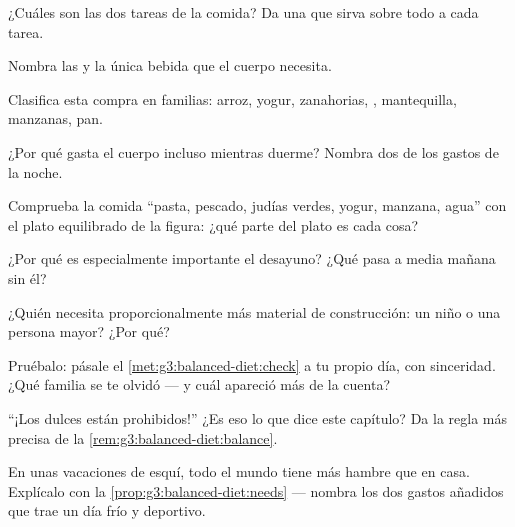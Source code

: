 \begin{exercise}[$\star$]\label{exo:g3:balanced-diet:1}
¿Cuáles son las dos tareas de la comida? Da una 
que sirva sobre todo a cada tarea.
\end{exercise}

\begin{exercise}[$\star$]\label{exo:g3:balanced-diet:2}
Nombra las  y la única bebida que el cuerpo necesita.
\end{exercise}

\begin{exercise}[$\star$]\label{exo:g3:balanced-diet:3}
Clasifica esta compra en familias: arroz, yogur, zanahorias, ,
mantequilla, manzanas, pan.
\end{exercise}

\begin{exercise}[$\star$]\label{exo:g3:balanced-diet:4}
¿Por qué gasta  el cuerpo incluso mientras duerme? Nombra dos
de los gastos de la noche.
\end{exercise}

\begin{exercise}[$\star$]\label{exo:g3:balanced-diet:5}
Comprueba la comida ``pasta, pescado, judías verdes, yogur, manzana,
agua'' con el plato equilibrado de la figura: ¿qué parte del plato es
cada cosa?
\end{exercise}

\begin{exercise}[$\star$]\label{exo:g3:balanced-diet:6}
¿Por qué es especialmente importante el desayuno? ¿Qué pasa a media
mañana sin él?
\end{exercise}

\begin{exercise}[$\star$]\label{exo:g3:balanced-diet:7}
¿Quién necesita proporcionalmente más material de construcción: un
niño o una persona mayor? ¿Por qué?
\end{exercise}

\begin{exercise}[$\star$]\label{exo:g3:balanced-diet:8}
Pruébalo: pásale el \cref{met:g3:balanced-diet:check} a tu propio día,
con sinceridad. ¿Qué familia se te olvidó --- y cuál apareció más de
la cuenta?
\end{exercise}

\begin{exercise}[$\star\star$]\label{exo:g3:balanced-diet:9}
``¡Los dulces están prohibidos!'' ¿Es eso lo que dice este capítulo?
Da la regla más precisa de la \cref{rem:g3:balanced-diet:balance}.
\end{exercise}

\begin{exercise}[$\star\star$]\label{exo:g3:balanced-diet:10}
En unas vacaciones de esquí, todo el mundo tiene más hambre que en
casa. Explícalo con la \cref{prop:g3:balanced-diet:needs} --- nombra
los dos gastos añadidos que trae un día frío y deportivo.
\end{exercise}
